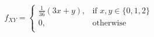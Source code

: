 \documentclass[preview]{standalone}
\begin{document}
\begin{align*}
f_{XY} = \begin{cases}\frac{1}{36} (3x + y), & \text{if } x,y \in \{0,1,2\} \\0, & \text{otherwise}\\\end{cases}
\end{align*}
\end{document}
